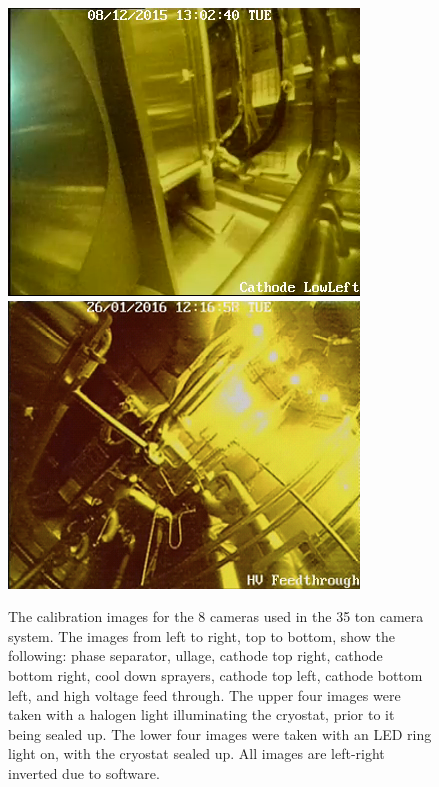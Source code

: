 \begin{figure}
   \includegraphics[width=\linewidth]{cathodell}
 \endminipage
   \includegraphics[width=\linewidth]{hvft}
 \endminipage
 \caption[The calibration images for the 8 cameras used in the 35 ton camera system]
         {The calibration images for the 8 cameras used in the 35 ton camera system.  The images from left to right, top to bottom, show the following: phase separator, ullage, cathode top right, cathode bottom right, cool down sprayers, cathode top left, cathode bottom left, and high voltage feed through.  The upper four images were taken with a halogen light illuminating the cryostat, prior to it being sealed up.  The lower four images were taken with an LED ring light on, with the cryostat sealed up.  All images are left-right inverted due to software.}
 \label{fig:CamFOV}
\end{figure}

